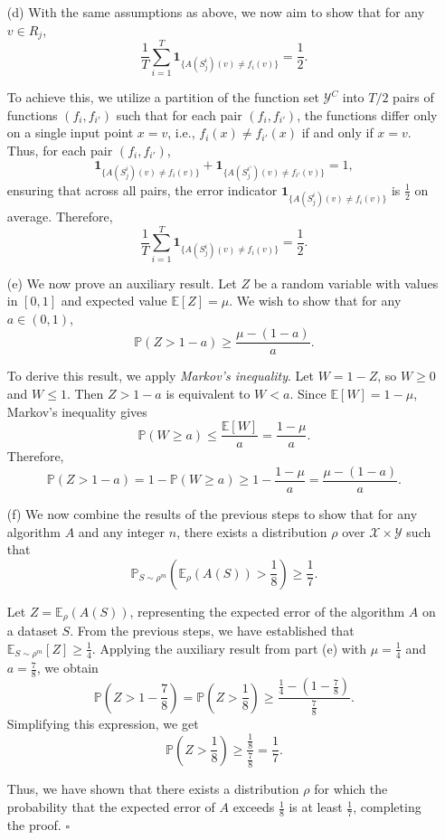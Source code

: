 \documentclass{article}
\begin{document}
\begin{itemize}
    \item[(d)] With the same assumptions as above, we now aim to show that for any \( v \in R_j \),
    \[
    \frac{1}{T} \sum_{i=1}^T \mathbf{1}_{\{A(S_j^i)(v) \neq f_i(v)\}} = \frac{1}{2}.
    \]
    
    To achieve this, we utilize a partition of the function set \( \mathcal{Y}^C \) into \( T/2 \) pairs of functions \( (f_i, f_{i'}) \) such that for each pair \( (f_i, f_{i'}) \), the functions differ only on a single input point \( x = v \), i.e., \( f_i(x) \neq f_{i'}(x) \) if and only if \( x = v \). Thus, for each pair \( (f_i, f_{i'}) \),
    \[
    \mathbf{1}_{\{A(S_j^i)(v) \neq f_i(v)\}} + \mathbf{1}_{\{A(S_j^{i'})(v) \neq f_{i'}(v)\}} = 1,
    \]
    ensuring that across all pairs, the error indicator \( \mathbf{1}_{\{A(S_j^i)(v) \neq f_i(v)\}} \) is \( \frac{1}{2} \) on average. Therefore,
    \[
    \frac{1}{T} \sum_{i=1}^T \mathbf{1}_{\{A(S_j^i)(v) \neq f_i(v)\}} = \frac{1}{2}.
    \]

    \item[(e)] We now prove an auxiliary result. Let \( Z \) be a random variable with values in \( [0, 1] \) and expected value \( \mathbb{E}[Z] = \mu \). We wish to show that for any \( a \in (0, 1) \),
    \[
    \mathbb{P}(Z > 1 - a) \ge \frac{\mu - (1 - a)}{a}.
    \]
    
    To derive this result, we apply \textit{Markov's inequality}. Let \( W = 1 - Z \), so \( W \ge 0 \) and \( W \le 1 \). Then \( Z > 1 - a \) is equivalent to \( W < a \). Since \( \mathbb{E}[W] = 1 - \mu \), Markov’s inequality gives
    \[
    \mathbb{P}(W \ge a) \le \frac{\mathbb{E}[W]}{a} = \frac{1 - \mu}{a}.
    \]
    Therefore,
    \[
    \mathbb{P}(Z > 1 - a) = 1 - \mathbb{P}(W \ge a) \ge 1 - \frac{1 - \mu}{a} = \frac{\mu - (1 - a)}{a}.
    \]

    \item[(f)] We now combine the results of the previous steps to show that for any algorithm \( A \) and any integer \( n \), there exists a distribution \( \rho \) over \( \mathcal{X} \times \mathcal{Y} \) such that
    \[
    \mathbb{P}_{S \sim \rho^m}\left( \mathbb{E}_\rho(A(S)) > \frac{1}{8} \right) \ge \frac{1}{7}.
    \]
    
    Let \( Z = \mathbb{E}_\rho(A(S)) \), representing the expected error of the algorithm \( A \) on a dataset \( S \). From the previous steps, we have established that \( \mathbb{E}_{S \sim \rho^m}[Z] \ge \frac{1}{4} \). Applying the auxiliary result from part (e) with \( \mu = \frac{1}{4} \) and \( a = \frac{7}{8} \), we obtain
    \[
    \mathbb{P}\left(Z > 1 - \frac{7}{8}\right) = \mathbb{P}\left(Z > \frac{1}{8}\right) \ge \frac{\frac{1}{4} - \left(1 - \frac{7}{8}\right)}{\frac{7}{8}}.
    \]
    Simplifying this expression, we get
    \[
    \mathbb{P}\left(Z > \frac{1}{8}\right) \ge \frac{\frac{1}{8}}{\frac{7}{8}} = \frac{1}{7}.
    \]
    
    Thus, we have shown that there exists a distribution \( \rho \) for which the probability that the expected error of \( A \) exceeds \( \frac{1}{8} \) is at least \( \frac{1}{7} \), completing the proof. \(\square\)
    
\end{itemize}
\end{document}
